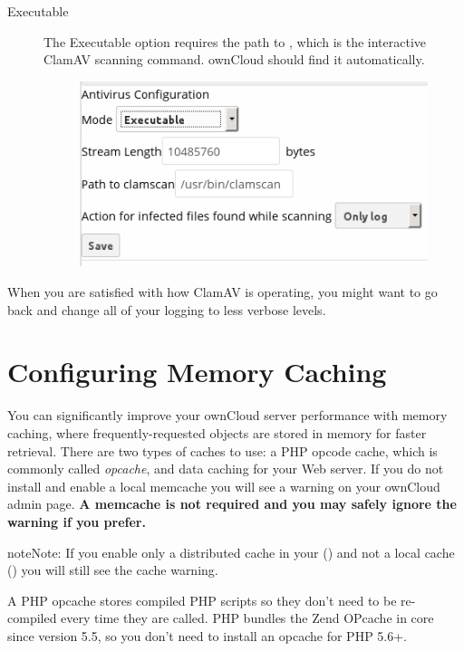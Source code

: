 \documentclass[letterpaper,10pt,english]{sphinxmanual}
\begin{document}
\begin{description}
\item[{Executable}] \leavevmode
The Executable option requires the path to , which is the
interactive ClamAV scanning command. ownCloud should find it automatically.
\begin{figure}[htbp]
\centering

\includegraphics{antivirus-executable.png}
\end{figure}

\end{description}

When you are satisfied with how ClamAV is operating, you might want to go
back and change all of your logging to less verbose levels.


\section{Configuring Memory Caching}
\label{configuration_server/caching_configuration:configuring-memory-caching}\label{configuration_server/caching_configuration::doc}
You can significantly improve your ownCloud server performance with memory
caching, where frequently-requested objects are stored in memory for faster
retrieval. There are two types of caches to use: a PHP opcode cache, which is
commonly called \emph{opcache}, and data caching for your Web server. If you do not
install and enable a local memcache you will see a warning on your ownCloud
admin page. \textbf{A memcache is not required and you may safely ignore the warning
if you prefer.}

\begin{notice}{note}{Note:}
If you enable only a distributed cache in
your  () and not a
local cache () you will still see the cache warning.
\end{notice}

A PHP opcache stores compiled PHP scripts so they don't need to be re-compiled
every time they are called. PHP bundles the Zend OPcache in core since version
5.5, so you don't need to install an opcache for PHP 5.6+.
\end{document}
